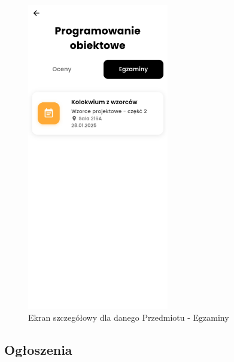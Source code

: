 \begin{figure}[h!]
	\centering
	\includegraphics[width=0.55\textwidth]{rys/przedmiotyv5.png}
	\caption{Ekran szczegółowy dla danego Przedmiotu - Egzaminy}
	\label{rys:Przedmiotyv5}
\end{figure}

\newpage
\subsection{Ogłoszenia}

